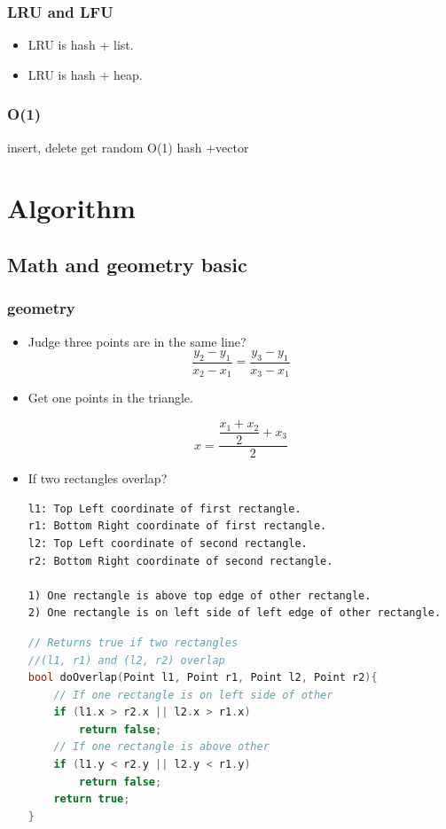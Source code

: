 \documentclass[a4paper,11pt,twoside]{book}
\begin{document}
\subsection{LRU and LFU}
\begin{itemize}
	\item  LRU is hash + list.
	\item  LRU is hash + heap.
\end{itemize}

	
\subsection{O(1)}
insert, delete get random O(1)  hash +vector
	


\chapter{Algorithm}
\section{Math and geometry basic}
\subsection{geometry}
\begin{itemize}
\item Judge three points are in the same line?
\[
\dfrac{y_{2}-y_{1}}{x_{2}-x_{1}}  = \dfrac{y_{3}-y_{1}}{x_{3}-x_{1}}
\]

\item Get one points in the triangle. 

\[
x = \dfrac{\dfrac{x_{1}+x_{2}}{2}+x_{3}}{2}
\]

\item If two rectangles overlap?
\begin{verbatim}
l1: Top Left coordinate of first rectangle.
r1: Bottom Right coordinate of first rectangle.
l2: Top Left coordinate of second rectangle.
r2: Bottom Right coordinate of second rectangle.

1) One rectangle is above top edge of other rectangle.
2) One rectangle is on left side of left edge of other rectangle.
\end{verbatim}

\begin{lstlisting}[frame=single, language=c++]
// Returns true if two rectangles 
//(l1, r1) and (l2, r2) overlap
bool doOverlap(Point l1, Point r1, Point l2, Point r2){
    // If one rectangle is on left side of other
    if (l1.x > r2.x || l2.x > r1.x)
        return false;
    // If one rectangle is above other
    if (l1.y < r2.y || l2.y < r1.y)
        return false;
    return true;
}
\end{lstlisting}

\end{itemize}
\end{document}
